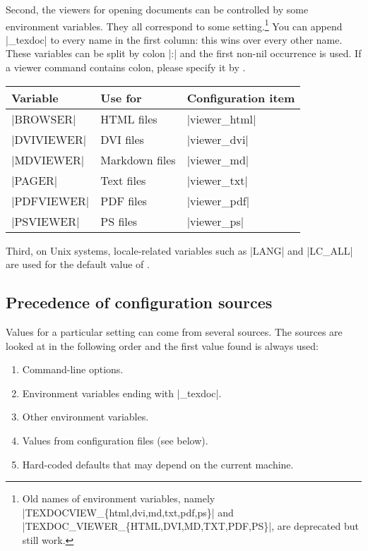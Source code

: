 \documentclass{texdoc-doc}
\begin{document}
Second, the viewers for opening documents can be controlled by some environment
variables. They all correspond to some 
setting.\footnote{Old names of environment variables, namely
|TEXDOCVIEW_\{html,dvi,md,txt,pdf,ps\}| and
|TEXDOC_VIEWER_\{HTML,DVI,MD,TXT,PDF,PS\}|, are deprecated but still work.} You
can append |_texdoc| to every name in the first column: this wins over every
other name. These variables can be split by colon |:| and the first non-nil
occurrence is used. If a viewer command contains colon, please specify it by
.
%
\begin{center}
\begin{tabular}{lll}
Variable & Use for & Configuration item \\ \hline
|BROWSER| & HTML files & |viewer_html| \\
|DVIVIEWER| & DVI files & |viewer_dvi| \\
|MDVIEWER| & Markdown files & |viewer_md| \\
|PAGER| & Text files & |viewer_txt| \\
|PDFVIEWER| & PDF files & |viewer_pdf| \\
|PSVIEWER| & PS files & |viewer_ps| \\
\end{tabular}
\end{center}

Third, on Unix systems, locale-related variables such as |LANG| and |LC_ALL|
are used for the default value of .

\subsection{Precedence of configuration sources}
\label{sec:prec}

Values for a particular setting can come from several sources. The sources are
looked at in the following order and the first value found is always used:
%
\begin{enumerate}
\item Command-line options.
\item Environment variables ending with |_texdoc|.
\item Other environment variables.
\item Values from configuration files (see below).
\item Hard-coded defaults that may depend on the current machine.
\end{enumerate}
\end{document}
